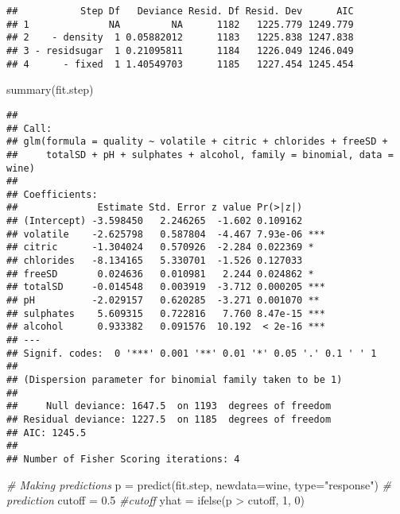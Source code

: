 \documentclass[
]{article}
\newenvironment{Shaded}{\begin{snugshade}}{\end{snugshade}}
\newcommand{\AttributeTok}[1]{\textcolor[rgb]{0.77,0.63,0.00}{#1}}
\newcommand{\CommentTok}[1]{\textcolor[rgb]{0.56,0.35,0.01}{\textit{#1}}}
\newcommand{\DecValTok}[1]{\textcolor[rgb]{0.00,0.00,0.81}{#1}}
\newcommand{\FloatTok}[1]{\textcolor[rgb]{0.00,0.00,0.81}{#1}}
\newcommand{\FunctionTok}[1]{\textcolor[rgb]{0.00,0.00,0.00}{#1}}
\newcommand{\NormalTok}[1]{#1}
\newcommand{\OtherTok}[1]{\textcolor[rgb]{0.56,0.35,0.01}{#1}}
\newcommand{\SpecialCharTok}[1]{\textcolor[rgb]{0.00,0.00,0.00}{#1}}
\newcommand{\StringTok}[1]{\textcolor[rgb]{0.31,0.60,0.02}{#1}}
\begin{document}
\begin{verbatim}
##           Step Df   Deviance Resid. Df Resid. Dev      AIC
## 1              NA         NA      1182   1225.779 1249.779
## 2    - density  1 0.05882012      1183   1225.838 1247.838
## 3 - residsugar  1 0.21095811      1184   1226.049 1246.049
## 4      - fixed  1 1.40549703      1185   1227.454 1245.454
\end{verbatim}

\begin{Shaded}
\begin{Highlighting}[]
\FunctionTok{summary}\NormalTok{(fit.step)}
\end{Highlighting}
\end{Shaded}

\begin{verbatim}
## 
## Call:
## glm(formula = quality ~ volatile + citric + chlorides + freeSD + 
##     totalSD + pH + sulphates + alcohol, family = binomial, data = wine)
## 
## Coefficients:
##              Estimate Std. Error z value Pr(>|z|)    
## (Intercept) -3.598450   2.246265  -1.602 0.109162    
## volatile    -2.625798   0.587804  -4.467 7.93e-06 ***
## citric      -1.304024   0.570926  -2.284 0.022369 *  
## chlorides   -8.134165   5.330701  -1.526 0.127033    
## freeSD       0.024636   0.010981   2.244 0.024862 *  
## totalSD     -0.014548   0.003919  -3.712 0.000205 ***
## pH          -2.029157   0.620285  -3.271 0.001070 ** 
## sulphates    5.609315   0.722816   7.760 8.47e-15 ***
## alcohol      0.933382   0.091576  10.192  < 2e-16 ***
## ---
## Signif. codes:  0 '***' 0.001 '**' 0.01 '*' 0.05 '.' 0.1 ' ' 1
## 
## (Dispersion parameter for binomial family taken to be 1)
## 
##     Null deviance: 1647.5  on 1193  degrees of freedom
## Residual deviance: 1227.5  on 1185  degrees of freedom
## AIC: 1245.5
## 
## Number of Fisher Scoring iterations: 4
\end{verbatim}

\begin{Shaded}
\begin{Highlighting}[]
\CommentTok{\# Making predictions}
\NormalTok{p }\OtherTok{=} \FunctionTok{predict}\NormalTok{(fit.step, }\AttributeTok{newdata=}\NormalTok{wine, }\AttributeTok{type=}\StringTok{"response"}\NormalTok{) }\CommentTok{\# prediction}
\NormalTok{cutoff }\OtherTok{=} \FloatTok{0.5} \CommentTok{\#cutoff}
\NormalTok{yhat }\OtherTok{=} \FunctionTok{ifelse}\NormalTok{(p }\SpecialCharTok{\textgreater{}}\NormalTok{ cutoff, }\DecValTok{1}\NormalTok{, }\DecValTok{0}\NormalTok{)}
\end{Highlighting}
\end{Shaded}
\end{document}
